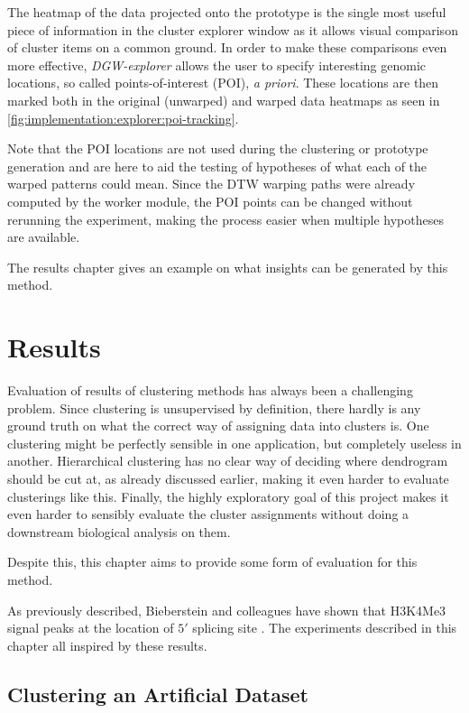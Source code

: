 \documentclass[parskip]{cs4rep}
\newcommand{\histonemodification}[1]{#1}
\begin{document}
The heatmap of the data projected onto the prototype is the single most useful piece of information in the cluster explorer window as it allows visual comparison of cluster items on a common ground.
In order to make these comparisons even more effective, \emph{DGW-explorer} allows the user to specify interesting genomic locations, so called points-of-interest (POI), \emph{a priori}. These locations are then marked both in the original (unwarped) and warped data heatmaps as seen in \autoref{fig:implementation:explorer:poi-tracking}.

Note that the POI locations are not used during the clustering or prototype generation and are here to aid the testing of hypotheses of what each of the warped patterns could mean. Since the DTW warping paths were already computed by the worker module, the POI points can be changed without rerunning the experiment, making the process easier when multiple hypotheses are available.

The results chapter gives an example on what insights can be generated by this method.

\chapter{Results}
\label{cha:results}
Evaluation of results of clustering methods has always been a challenging problem. Since clustering is unsupervised by definition, there hardly is any ground truth on what the correct way of assigning data into clusters is. One clustering might be perfectly sensible in one application, but completely useless in another. Hierarchical clustering has no clear way of deciding where dendrogram should be cut at, as already discussed earlier, making it even harder to evaluate clusterings like this. Finally, the highly exploratory goal of this project makes it even harder to sensibly evaluate the cluster assignments without doing a downstream biological analysis on them.

Despite this, this chapter aims to provide some form of evaluation for this method.

As previously described, Bieberstein and colleagues have shown that \histonemodification{H3K4Me3} signal peaks at the location of $5'$ splicing site \cite{Bieberstein:2012tf}. The experiments described in this chapter all inspired by these results.

\section{Clustering an Artificial Dataset}
\end{document}
